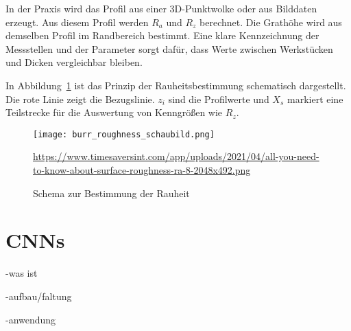 In der Praxis wird das Profil aus einer 3D-Punktwolke oder aus Bilddaten erzeugt. Aus diesem Profil werden \(R_a\) und \(R_z\) berechnet. Die Grathöhe wird aus demselben Profil im Randbereich bestimmt. Eine klare Kennzeichnung der Messstellen und der Parameter sorgt dafür, dass Werte zwischen Werkstücken und Dicken vergleichbar bleiben.

In Abbildung~\ref{fig:roughness-profile} ist das Prinzip der Rauheitsbestimmung schematisch dargestellt. Die rote Linie zeigt die Bezugslinie. \(z_i\) sind die Profilwerte und \(X_{s}\) markiert eine Teilstrecke für die Auswertung von Kenngrößen wie \(R_z\).

\begin{figure}[htbp]
  \centering
  \texttt{[image: burr\_roughness\_schaubild.png]}%
  \caption[Schema zur Bestimmung der Rauheit]{Schema zur Bestimmung der Rauheit}
\url{https://www.timesaversint.com/app/uploads/2021/04/all-you-need-to-know-about-surface-roughness-ra-8-2048x492.png}
  \label{fig:roughness-profile}
\end{figure}


\section{CNNs}
-was ist

-aufbau/faltung

-anwendung